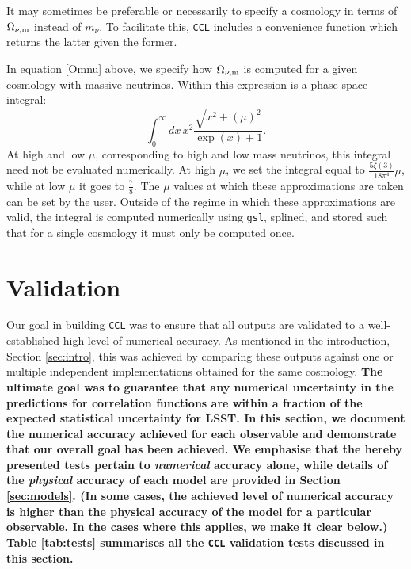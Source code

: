 \documentclass[\docopts]{\docclass}
\newcommand{\ccl}{{\tt CCL}\xspace}
\begin{document}
It may sometimes be preferable or necessarily to specify a cosmology in terms of $\Omega_{\nu, {\rm m}}$ instead of $m_\nu$. To facilitate this, \ccl includes a convenience function which returns the latter given the former.

In equation \ref{Omnu} above, we specify how $\Omega_{\nu, {\rm m}}$ is computed for a given cosmology with massive neutrinos. Within this expression is a phase-space integral:
\begin{equation}
\int_0^{\infty} dx \, x^2 \frac{\sqrt{x^2 + \left(\mu\right)^2}}{\exp(x) + 1}.
\label{phasespacenu}
\end{equation}
At high and low $\mu$, corresponding to high and low mass neutrinos, this integral need not be evaluated numerically. At high $\mu$, we set the integral equal to $\frac{5\zeta(3)}{18\pi^4}\mu$, while at low $\mu$ it goes to $\frac{7}{8}$. The $\mu$ values at which these approximations are taken can be set by the user. Outside of the regime in which these approximations are valid, the integral is computed numerically using {\tt gsl}, splined, and stored such that for a single cosmology it must only be computed once.


\section{Validation}
\label{sec:validation}

Our goal in building \ccl was to ensure that all outputs are validated to a well-established high level of numerical accuracy. As mentioned in the introduction, Section \ref{sec:intro}, this was achieved by comparing these outputs against one or multiple independent implementations obtained for the same cosmology. {\bf The ultimate goal was to guarantee that any numerical uncertainty in the predictions for correlation functions are within a fraction of the expected statistical uncertainty for LSST. In this section, we document the numerical accuracy achieved for each observable and demonstrate that our overall goal has been achieved. We emphasise that the hereby presented tests pertain to {\it numerical} accuracy alone, while details of the {\it physical} accuracy of each model are provided in Section \ref{sec:models}. (In some cases, the achieved level of numerical accuracy is higher than the physical accuracy of the model for a particular observable. In the cases where this applies, we make it clear below.) Table \ref{tab:tests} summarises all the \ccl validation tests discussed in this section.}
\end{document}
